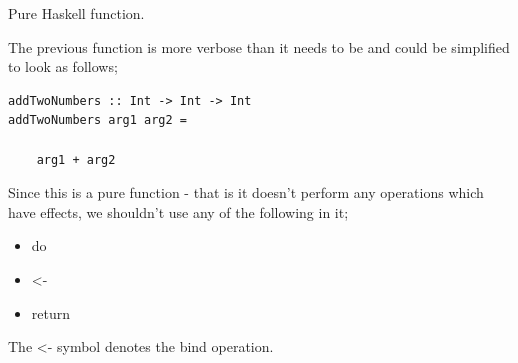 \begin{frame}[t, fragile]{Pure Haskell function.}

The previous function is more verbose than it needs to be and could be
simplified to look as follows;

\begin{verbatim}
addTwoNumbers :: Int -> Int -> Int
addTwoNumbers arg1 arg2 =

    arg1 + arg2
\end{verbatim}

Since this is a pure function - that is it doesn't perform any operations
which have effects, we shouldn't use any of the following in it;

\begin{itemize}
    \item do
    \item \textless-
    \item return
\end{itemize}

The \textless- symbol denotes the bind operation.

\end{frame}